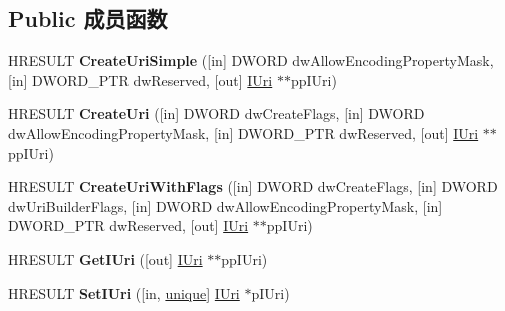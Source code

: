 \subsection*{Public 成员函数}
\begin{DoxyCompactItemize}
\item 
\mbox{\label{interface_i_uri_builder_acf22312a4254d4a64cd703190a6ca4b8}} 
H\+R\+E\+S\+U\+LT {\bfseries Create\+Uri\+Simple} (\mbox{[}in\mbox{]} D\+W\+O\+RD dw\+Allow\+Encoding\+Property\+Mask, \mbox{[}in\mbox{]} D\+W\+O\+R\+D\+\_\+\+P\+TR dw\+Reserved, \mbox{[}out\mbox{]} \hyperlink{interface_i_uri}{I\+Uri} $\ast$$\ast$pp\+I\+Uri)
\item 
\mbox{\label{interface_i_uri_builder_af9c5be2e2e405ab2183ee64f7f0691e0}} 
H\+R\+E\+S\+U\+LT {\bfseries Create\+Uri} (\mbox{[}in\mbox{]} D\+W\+O\+RD dw\+Create\+Flags, \mbox{[}in\mbox{]} D\+W\+O\+RD dw\+Allow\+Encoding\+Property\+Mask, \mbox{[}in\mbox{]} D\+W\+O\+R\+D\+\_\+\+P\+TR dw\+Reserved, \mbox{[}out\mbox{]} \hyperlink{interface_i_uri}{I\+Uri} $\ast$$\ast$pp\+I\+Uri)
\item 
\mbox{\label{interface_i_uri_builder_af3371501e5a4a725cd3762c9bc95049a}} 
H\+R\+E\+S\+U\+LT {\bfseries Create\+Uri\+With\+Flags} (\mbox{[}in\mbox{]} D\+W\+O\+RD dw\+Create\+Flags, \mbox{[}in\mbox{]} D\+W\+O\+RD dw\+Uri\+Builder\+Flags, \mbox{[}in\mbox{]} D\+W\+O\+RD dw\+Allow\+Encoding\+Property\+Mask, \mbox{[}in\mbox{]} D\+W\+O\+R\+D\+\_\+\+P\+TR dw\+Reserved, \mbox{[}out\mbox{]} \hyperlink{interface_i_uri}{I\+Uri} $\ast$$\ast$pp\+I\+Uri)
\item 
\mbox{\label{interface_i_uri_builder_a1716f6bb784b7e1c6e6387782b709fef}} 
H\+R\+E\+S\+U\+LT {\bfseries Get\+I\+Uri} (\mbox{[}out\mbox{]} \hyperlink{interface_i_uri}{I\+Uri} $\ast$$\ast$pp\+I\+Uri)
\item 
\mbox{\label{interface_i_uri_builder_a4c34f4c54d05b9029b692d66af0030ce}} 
H\+R\+E\+S\+U\+LT {\bfseries Set\+I\+Uri} (\mbox{[}in, \hyperlink{interfaceunique}{unique}\mbox{]} \hyperlink{interface_i_uri}{I\+Uri} $\ast$p\+I\+Uri)
\item 
\mbox{\label{interface_i_uri_builder_ace7220a6630a2c3a212ffc367fe5b8e0}} 

\end{DoxyCompactItemize}
